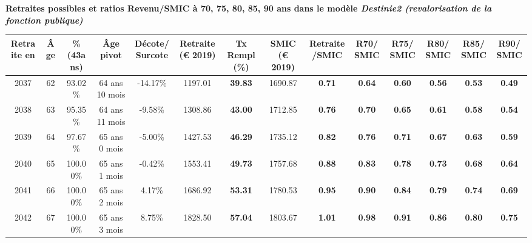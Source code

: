  \vspace{0.1cm} 
{\bf \noindent Retraites possibles et ratios Revenu/SMIC à 70, 75, 80, 85, 90 ans dans le modèle \emph{Destinie2 (revalorisation de la fonction publique)}}  
 
\begin{adjustbox}{max width=\textwidth} 
\begin{tabular}[htb]{|c|c||c|c|c||c|c||c|c||c|c|c|c|c|} 
\hline 
 Retraite en &  Âge &  \%(43ans) &  Âge pivot &  Décote/Surcote &  Retraite (\euro{} 2019) &  Tx Rempl(\%) &  SMIC (\euro{} 2019) &  Retraite/SMIC &  R70/SMIC &  R75/SMIC &  R80/SMIC &  R85/SMIC &  R90/SMIC \\ 
\hline \hline 
 2037 &  62 &  93.02\% &  64 ans 10 mois &  -14.17\% &  1197.01 &  {\bf 39.83} &  1690.87 &  {\bf {\color{red} 0.71}} &  {\bf {\color{red} 0.64}} &  {\bf {\color{red} 0.60}} &  {\bf {\color{red} 0.56}} &  {\bf {\color{red} 0.53}} &  {\bf {\color{red} 0.49}} \\ 
\hline 
 2038 &  63 &  95.35\% &  64 ans 11 mois &  -9.58\% &  1308.86 &  {\bf 43.00} &  1712.85 &  {\bf {\color{red} 0.76}} &  {\bf {\color{red} 0.70}} &  {\bf {\color{red} 0.65}} &  {\bf {\color{red} 0.61}} &  {\bf {\color{red} 0.58}} &  {\bf {\color{red} 0.54}} \\ 
\hline 
 2039 &  64 &  97.67\% &  65 ans 0 mois &  -5.00\% &  1427.53 &  {\bf 46.29} &  1735.12 &  {\bf {\color{red} 0.82}} &  {\bf {\color{red} 0.76}} &  {\bf {\color{red} 0.71}} &  {\bf {\color{red} 0.67}} &  {\bf {\color{red} 0.63}} &  {\bf {\color{red} 0.59}} \\ 
\hline 
 2040 &  65 &  100.00\% &  65 ans 1 mois &  -0.42\% &  1553.41 &  {\bf 49.73} &  1757.68 &  {\bf {\color{red} 0.88}} &  {\bf {\color{red} 0.83}} &  {\bf {\color{red} 0.78}} &  {\bf {\color{red} 0.73}} &  {\bf {\color{red} 0.68}} &  {\bf {\color{red} 0.64}} \\ 
\hline 
 2041 &  66 &  100.00\% &  65 ans 2 mois &  4.17\% &  1686.92 &  {\bf 53.31} &  1780.53 &  {\bf {\color{red} 0.95}} &  {\bf {\color{red} 0.90}} &  {\bf {\color{red} 0.84}} &  {\bf {\color{red} 0.79}} &  {\bf {\color{red} 0.74}} &  {\bf {\color{red} 0.69}} \\ 
\hline 
 2042 &  67 &  100.00\% &  65 ans 3 mois &  8.75\% &  1828.50 &  {\bf 57.04} &  1803.67 &  {\bf 1.01} &  {\bf {\color{red} 0.98}} &  {\bf {\color{red} 0.91}} &  {\bf {\color{red} 0.86}} &  {\bf {\color{red} 0.80}} &  {\bf {\color{red} 0.75}} \\ 
\hline 
\hline 
\end{tabular} 
\end{adjustbox} 
 
